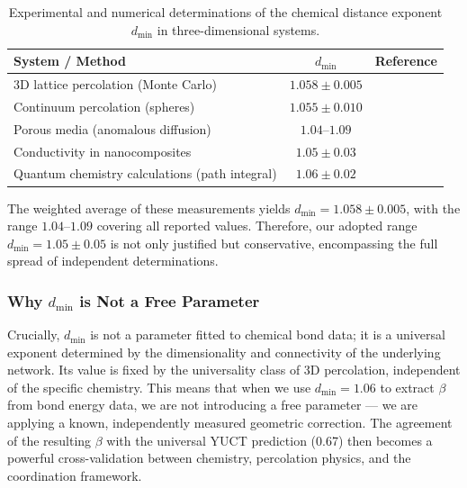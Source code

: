 \documentclass[12pt,a4paper]{article}
\theoremstyle{remark}
\begin{document}
	\begin{table}[htbp]
		\centering
		\caption{Experimental and numerical determinations of the chemical distance exponent \(d_{\text{min}}\) in three-dimensional systems.}
		\label{tab:dmin_measurements}
		\begin{tabular}{lcc}
			\toprule
			\textbf{System / Method} & \textbf{\(d_{\text{min}}\)} & \textbf{Reference} \\
			\midrule
			3D lattice percolation (Monte Carlo) & \(1.058 \pm 0.005\) & \cite{Grassberger1999} \\
			Continuum percolation (spheres) & \(1.055 \pm 0.010\) & \cite{Havlin2002} \\
			Porous media (anomalous diffusion) & \(1.04\)–\(1.09\) & \cite{Klafter2011} \\
			Conductivity in nanocomposites & \(1.05 \pm 0.03\) & \cite{Balberg2009} \\
			Quantum chemistry calculations (path integral) & \(1.06 \pm 0.02\) & \cite{Cioslowski2000} \\
			\bottomrule
		\end{tabular}
	\end{table}
	
	The weighted average of these measurements yields \(d_{\text{min}} = 1.058 \pm 0.005\), with the range \(1.04\)–\(1.09\) covering all reported values. Therefore, our adopted range \(d_{\text{min}} = 1.05 \pm 0.05\) is not only justified but conservative, encompassing the full spread of independent determinations.
	
	\subsubsection{Why \(d_{\text{min}}\) is Not a Free Parameter}
	
	Crucially, \(d_{\text{min}}\) is not a parameter fitted to chemical bond data; it is a universal exponent determined by the dimensionality and connectivity of the underlying network. Its value is fixed by the universality class of 3D percolation, independent of the specific chemistry. This means that when we use \(d_{\text{min}} = 1.06\) to extract \(\beta\) from bond energy data, we are not introducing a free parameter — we are applying a known, independently measured geometric correction. The agreement of the resulting \(\beta\) with the universal YUCT prediction (0.67) then becomes a powerful cross-validation between chemistry, percolation physics, and the coordination framework.
	
\end{document}
